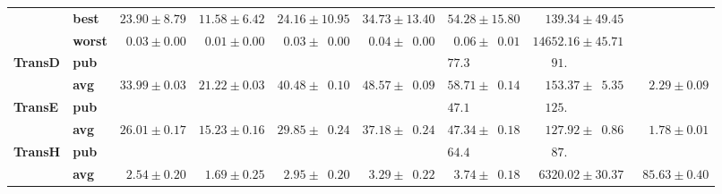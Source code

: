 \begin{tabular}{llrrrrrrr}
       & \textbf{best} &            $23.90 \pm 8.79$ &            $11.58 \pm 6.42$ &                      $24.16 \pm 10.95$ &                      $34.73 \pm 13.40$ &                      $54.28 \pm 15.80$ &            $\phantom{00}139.34 \pm 49.45$ &                              \\
       & \textbf{worst} &  $\phantom{0}0.03 \pm 0.00$ &  $\phantom{0}0.01 \pm 0.00$ &  $\phantom{0}0.03 \pm \phantom{0}0.00$ &  $\phantom{0}0.04 \pm \phantom{0}0.00$ &  $\phantom{0}0.06 \pm \phantom{0}0.01$ &                      $14652.16 \pm 45.71$ &                              \\
\textbf{TransD} & \textbf{pub} &                             &                             &                                        &                                        &            $77.3\phantom{0 \pm 00.00}$ &  $\phantom{000}91.\phantom{00 \pm 00.00}$ &                              \\
       & \textbf{avg} &            $33.99 \pm 0.03$ &            $21.22 \pm 0.03$ &            $40.48 \pm \phantom{0}0.10$ &            $48.57 \pm \phantom{0}0.09$ &            $58.71 \pm \phantom{0}0.14$ &  $\phantom{00}153.37 \pm \phantom{0}5.35$ &  $\phantom{00}2.29 \pm 0.09$ \\
\textbf{TransE} & \textbf{pub} &                             &                             &                                        &                                        &            $47.1\phantom{0 \pm 00.00}$ &  $\phantom{00}125.\phantom{00 \pm 00.00}$ &                              \\
       & \textbf{avg} &            $26.01 \pm 0.17$ &            $15.23 \pm 0.16$ &            $29.85 \pm \phantom{0}0.24$ &            $37.18 \pm \phantom{0}0.24$ &            $47.34 \pm \phantom{0}0.18$ &  $\phantom{00}127.92 \pm \phantom{0}0.86$ &  $\phantom{00}1.78 \pm 0.01$ \\
\textbf{TransH} & \textbf{pub} &                             &                             &                                        &                                        &            $64.4\phantom{0 \pm 00.00}$ &  $\phantom{000}87.\phantom{00 \pm 00.00}$ &                              \\
       & \textbf{avg} &  $\phantom{0}2.54 \pm 0.20$ &  $\phantom{0}1.69 \pm 0.25$ &  $\phantom{0}2.95 \pm \phantom{0}0.20$ &  $\phantom{0}3.29 \pm \phantom{0}0.22$ &  $\phantom{0}3.74 \pm \phantom{0}0.18$ &            $\phantom{0}6320.02 \pm 30.37$ &  $\phantom{0}85.63 \pm 0.40$ \\

\end{tabular}

